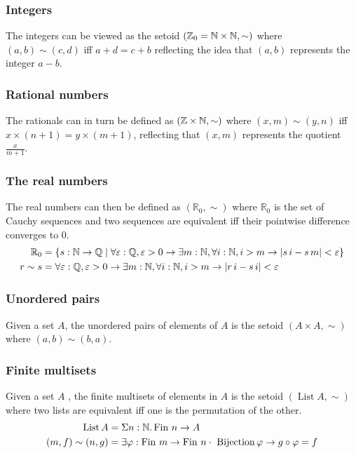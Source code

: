 \documentclass{llncs}
\DeclareMathOperator*{\List}{\mathrm{List}}
\DeclareMathOperator*{\Fin}{\mathrm{Fin}}
\newcommand{\Z}{\mathbb{Z}}
\newcommand{\RZ}{\mathbb{R}_0}
\begin{document}
\subsubsection*{Integers}
The integers can be viewed as the setoid $(\Z_0=\nat\times\nat,\sim)$ where $(a,b)\sim(c,d)$ if{f} $a+d=c+b$ reflecting the idea that $(a,b)$ represents the integer $a-b$.
\subsubsection*{Rational numbers}
The rationals can in turn be defined as $(\Z\times\nat,\sim)$ where $(x,m)\sim(y,n)$ if{f} $x\times(n+1)=y\times(m+1)$, reflecting that $(x,m)$ represents the quotient $\frac {x}{m+1}$.
\subsubsection*{The real numbers}
The real numbers can then be defined as $(\RZ,\sim)$ where $\RZ$ is the set of Cauchy sequences and two sequences are equivalent if{f} their pointwise difference converges to $0$. 
\begin{align*}
\RZ&=\set{s : \nat\to\Q \mid \forall\varepsilon :\Q,\varepsilon>0\to\exists m:\nat, \forall i:\nat, i>m\to |s\,i - s\, m|<\varepsilon}\\
r\sim s &= \forall\varepsilon :\Q,\varepsilon>0\to\exists m:\nat, \forall i:\nat, i>m\to |r\,i - s\,i|<\varepsilon
\end{align*}

\subsubsection*{Unordered pairs}
Given a set $A$, the unordered pairs of elements of $A$ is the setoid $(A\times A,\sim)$ where
$(a,b)\sim(b,a)$.

\subsubsection*{Finite multisets}
Given a set $A$ , the finite multisets of elements in $A$ is the setoid $(\List A,\sim)$ where two lists are equivalent if{f} one is the permutation of the other.
\begin{align*}
\List A &= \Sigma n:\nat.\Fin\,n\to A\\
(m,f)\sim(n,g) &= \exists \varphi : \Fin\,m \to \Fin\,n \cdot\ \mathrm{Bijection}\,\varphi \to g\circ\varphi = f  
\end{align*}
\end{document}
